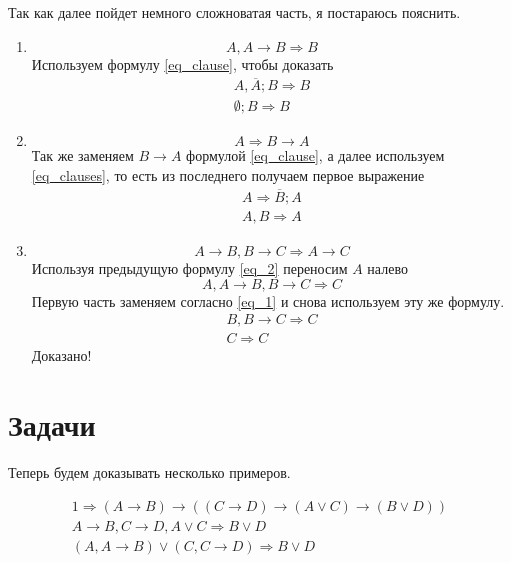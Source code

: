 Так как далее пойдет немного сложноватая часть, я постараюсь пояснить.
\begin{enumerate}
    \item
        \begin{equation}\label{eq_1}
            A, A \to B \Rightarrow B
        \end{equation}
        Используем формулу \ref{eq_clause}, чтобы доказать
        \begin{gather*}
            A, \overline A; B \Rightarrow B \\
            \emptyset; B \Rightarrow B
        \end{gather*}
    \item
        \begin{equation}\label{eq_2}
            A \Rightarrow B \to A
        \end{equation}
        Так же заменяем $B \to A$ формулой \ref{eq_clause},
        а далее используем \ref{eq_clauses}, то есть из последнего получаем первое выражение
        \begin{gather*}
            A \Rightarrow \overline B; A \\
            A, B \Rightarrow A
        \end{gather*}
    \item
        \begin{equation}\label{eq_3}
            A \to B, B \to C \Rightarrow A \to C
        \end{equation}
        Используя предыдущую формулу \ref{eq_2} переносим $A$ налево
        \begin{equation*}
            A, A \to B, B \to C \Rightarrow C
        \end{equation*}
        Первую часть заменяем согласно \ref{eq_1} и снова используем эту же формулу.
        \begin{gather*}
            B, B \to C \Rightarrow C \\
            C \Rightarrow C
        \end{gather*}
        Доказано!
\end{enumerate}

\section{Задачи}
Теперь будем доказывать несколько примеров.

\begin{task}
    \begin{gather*}
        1 \Rightarrow (A \to B) \to ((C \to D) \to (A \lor C) \to (B \lor D)) \\
        A \to B, C \to D, A \lor C \Rightarrow B \lor D \\
        (A, A \to B) \lor (C, C \to D) \Rightarrow B \lor D
    \end{gather*}
\end{task}

